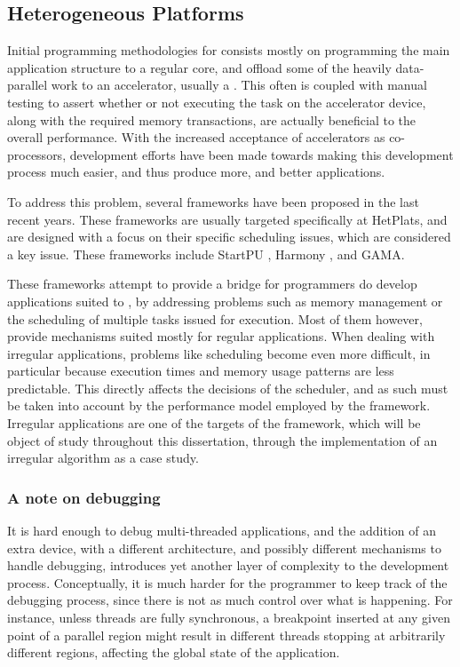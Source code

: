 \documentclass[main.tex]{subfiles}
\begin{document}
\subsection{Heterogeneous Platforms}

Initial programming methodologies for \hetplats consists mostly on programming the main application structure to a regular \cpu core, and offload some of the heavily data-parallel work to an accelerator, usually a \gpu. This often is coupled with manual testing to assert whether or not executing the task on the accelerator device, along with the required memory transactions, are actually beneficial to the overall performance. 
With the increased acceptance of accelerators as co-processors, development efforts have been made towards making this development process much easier, and thus produce more, and better applications.

To address this problem, several frameworks have been proposed in the last recent years. These frameworks are usually targeted specifically at \acp{HetPlat}, and are designed with a focus on their specific scheduling issues, which are considered a key issue. These frameworks include StartPU \cite{augonnet2011starpu}, Harmony \cite{diamos2008harmony}, and GAMA. 

These frameworks attempt to provide a bridge for programmers do develop applications suited to \hetplat, by addressing problems such as memory management or the scheduling of multiple tasks issued for execution. Most of them however, provide mechanisms suited mostly for regular applications. When dealing with irregular applications, problems like scheduling become even more difficult, in particular because execution times and memory usage patterns are less predictable. This directly affects the decisions of the scheduler, and as such must be taken into account by the performance model employed by the framework. Irregular applications are one of the targets of the \gama framework, which will be object of study throughout this dissertation, through the implementation of an irregular algorithm as a case study.

\subsubsection{A note on debugging}

It is hard enough to debug multi-threaded \cpu applications, and the addition of an extra device, with a different architecture, and possibly different mechanisms to handle debugging, introduces yet another layer of complexity to the development process. Conceptually, it is much harder for the programmer to keep track of the debugging process, since there is not as much control over what is happening. For instance, unless threads are fully synchronous, a breakpoint inserted at any given point of a parallel region might result in different threads stopping at arbitrarily different regions, affecting the global state of the application.
\end{document}
